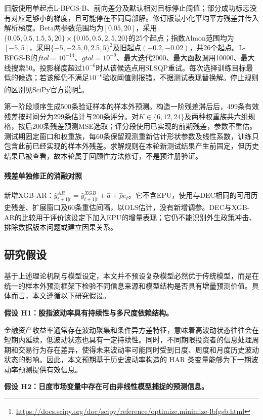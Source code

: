 旧版使用单起点L-BFGS-B、前向差分及默认相对目标停止阈值；部分成功标志没有对应足够小的梯度，且可能停在不同局部解。修订版最小化平均平方残差并传入解析梯度。Beta两参数范围均为$[0.05,20]$，采用$\{0.05,0.5,1.5,5,20\}\times\{0.05,0.5,2,5,20\}$的25个起点；指数Almon范围均为$[-5,5]$，采用$\{-5,-2.5,0,2.5,5\}^2$及旧起点$(-0.2,-0.02)$，共26个起点。L-BFGS-B的$ftol=10^{-14}$、$gtol=10^{-9}$、最大迭代2000、最大函数调用10000、最大线搜索50。投影梯度超过$10^{-6}$时从该候选点用SLSQP重试。每次选择训练目标最低的候选；若该解仍不满足$10^{-6}$验收阈值则报错，不据测试表现替换解。停止规则的区别见SciPy官方说明\footnote{\url{https://docs.scipy.org/doc/scipy/reference/optimize.minimize-lbfgsb.html}}。

第一阶段顺序生成500条验证样本的样本外预测。构造一阶残差滞后后，499条有效残差按时间分为299条估计与200条评分。对$K\in\{6,12,24\}$及两种权重族共六组规格，按后200条残差预测MSE选取；评分段使用已实现的前期残差，参数不重估。测试期固定窗口和权重族，每60条保留观测重新估计形状参数及线性系数，训练只包含此前已经实现的样本外残差。求解规则在本轮新测试结果产生前固定，但历史结果已被查看，故本轮属于回顾性方法修订，不是预注册验证。

\paragraph{残差单独修正的消融对照}
新增XGB-AR：$\hat y^{AR}_{t+1|t}=\hat y^{XGB}_{t+1|t}+\hat a+\hat\rho e_t$。它不含EPU，使用与DEC相同的可用历史残差、扩展窗口及60条重估间隔，以OLS估计，没有新增调参。DEC与XGB-AR的比较用于评价该设定下加入EPU的增量表现；它仍不能识别外生政策冲击、排除数据版本问题或建立因果关系。

\subsection{研究假设}

基于上述理论机制与模型设定，本文并不预设复杂模型必然优于传统模型，而是在统一的样本外预测框架下检验不同信息来源和模型结构是否具有增量预测价值。具体而言，本文遵循以下研究假设。

\textbf{假设 H1：股指波动率具有持续性与多尺度依赖结构。}

金融资产收益率通常存在波动聚集和条件异方差特征，意味着高波动状态往往会在短期内延续，低波动状态也具有一定持续性。同时，不同期限投资者的信息处理周期和交易行为存在差异，使得未来波动率可能同时受到日度、周度和月度历史波动状态的影响。因此，本文预期基于历史波动率构造的 HAR 类变量能够为下一期波动率预测提供有效信息。

\textbf{假设 H2：日度市场变量中存在可由非线性模型捕捉的预测信息。}


